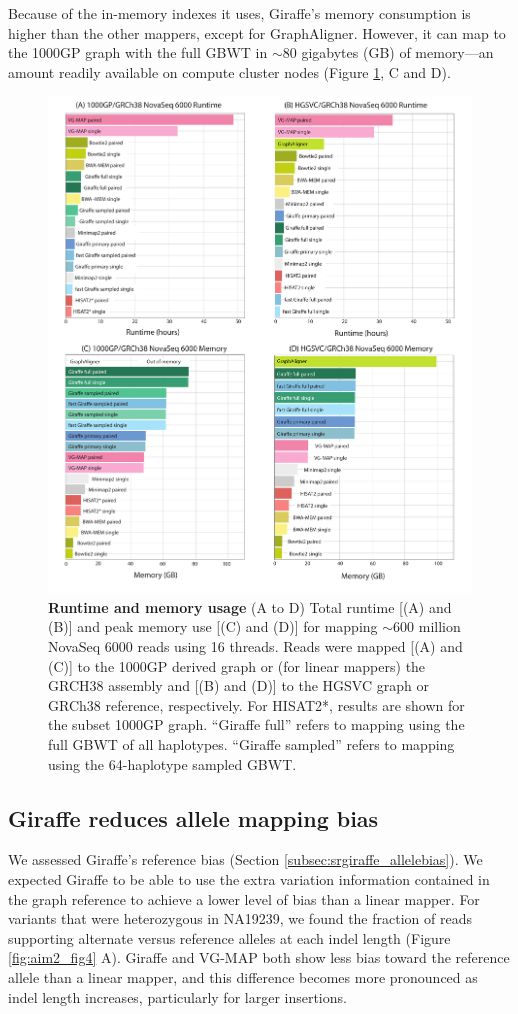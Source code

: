 \documentclass[11pt]{ucscthesis}
\begin{document}
Because of the in-memory indexes it uses, Giraffe’s memory consumption is higher than the other mappers, except for GraphAligner.
However, it can map to the 1000GP graph with the full GBWT in $\sim$80 gigabytes (GB) of memory—an amount readily available on compute cluster nodes (Figure \ref{fig:aim2_fig3}, C and D).

\begin{figure}
    \centering
    \includegraphics[width=.8\linewidth]{aim2_fig3.pdf}
    \caption[Runtime and memory usage]{\textbf{Runtime and memory usage} (A to D) Total runtime [(A) and (B)] and peak memory use [(C) and (D)] for mapping $\sim$600 million NovaSeq 6000 reads using 16 threads. Reads were mapped [(A) and (C)] to the 1000GP derived graph or (for linear mappers) the GRCH38 assembly and [(B) and (D)] to the HGSVC graph or GRCh38 reference, respectively. For HISAT2*, results are shown for the subset 1000GP graph. “Giraffe full” refers to mapping using the full GBWT of all haplotypes. “Giraffe sampled” refers to mapping using the 64-haplotype sampled GBWT.}
    \label{fig:aim2_fig3}
\end{figure}

\subsection{Giraffe reduces allele mapping bias}
We assessed Giraffe’s reference bias (Section \ref{subsec:srgiraffe_allelebias}).
We expected Giraffe to be able to use the extra variation information contained in the graph reference to achieve a lower level of bias than a linear mapper.
For variants that were heterozygous in NA19239, we found the fraction of reads supporting alternate versus reference alleles at each indel length (Figure \ref{fig:aim2_fig4} A).
Giraffe and VG-MAP both show less bias toward the reference allele than a linear mapper, and this difference becomes more pronounced as indel length increases, particularly for larger insertions.
\end{document}
